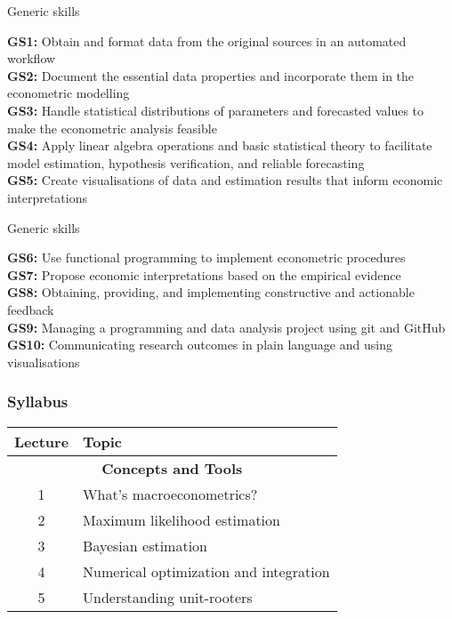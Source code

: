 \documentclass[notes,blackandwhite,mathsans]{beamer}
\begin{document}
\begin{frame}{Generic skills}

\textbf{GS1:} Obtain and format data from the original sources in an automated workflow\\[1ex]
\textbf{GS2:} Document the essential data properties and incorporate them in the econometric modelling\\[1ex]
\textbf{GS3:} Handle statistical distributions of parameters and forecasted values to make the econometric analysis feasible\\[1ex]
\textbf{GS4:} Apply linear algebra operations and basic statistical theory to facilitate model estimation, hypothesis verification, and reliable forecasting\\[1ex]
\textbf{GS5:} Create visualisations of data and estimation results that inform economic interpretations \\[1ex]

\end{frame}



\begin{frame}{Generic skills}

\textbf{GS6:} Use functional programming to implement econometric procedures\\[1ex]
\textbf{GS7:} Propose economic interpretations based on the empirical evidence\\[1ex]
\textbf{GS8:} Obtaining, providing, and implementing constructive and actionable feedback\\[1ex]
\textbf{GS9:} Managing a programming and data analysis project using git and GitHub\\[1ex]
\textbf{GS10:} Communicating research outcomes in plain language and using visualisations

\end{frame}







\begin{frame}
\frametitle{Syllabus}

\begin{center}
\begin{tabular}{ c l}
\toprule 
Lecture & Topic \\
\midrule
\multicolumn{2}{c}{\textbf{Concepts and Tools}}\\
1  & {\color{mcxs2}What's macroeconometrics?} \\
2  & {\color{mcxs2}Maximum likelihood estimation}  \\
3  & {\color{mcxs1}Bayesian estimation} \\
4  & {\color{mcxs2}Numerical optimization and integration} \\
5  & {\color{mcxs2}Understanding unit-rooters} \\[1ex]\bottomrule
\end{tabular}
\end{center}
\end{frame}
\end{document}

